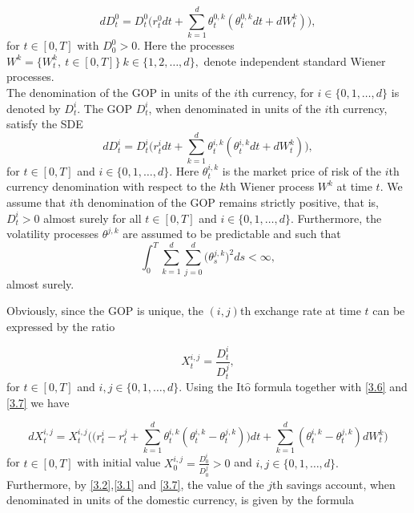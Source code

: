 \documentclass[a4 paper, 12pt]{report}
\theoremstyle{plain}
\begin{document}
\begin{equation}\label{3.5}
dD_t^0 = D_t^0\bigg(r_t^0dt+\sum_{k = 1}^d\theta_t^{0,k}(\theta_t^{0,k}dt+dW_t^k)\bigg),
\end{equation}
for $t \in [0, T]$ with $D_0^0>0$. Here the processes $W^k = \{ W^k_t,~t\in[0,T]\}~k\in \{1,2,\ldots,d\},$ denote independent standard Wiener processes.\\
The denomination of the GOP in units of the $i$th currency, for $i \in \{0, 1,\ldots, d\}$ %
 is denoted by $D_t^i$. The GOP $D_t^i$, when denominated in units of the $i$th
currency, satisfy the SDE
\begin{equation}\label{3.6}
dD_t^i = D_t^i\bigg(r_t^idt+\sum_{k = 1}^d\theta_t^{i,k}(\theta_t^{i,k}dt+dW_t^k)\bigg),
\end{equation}
for $t\in [0,T]$ and $i\in\{0,1,\ldots,d\}$. Here $\theta_t^{i,k}$ is the market price of risk of the $i$th currency denomination with respect to the $k$th Wiener process $W^k$ at time $t$. We assume that $i$th denomination of the GOP remains strictly positive, that is, $D_t^i>0$ almost surely for all $t\in[0,T]$ and $i\in\{0,1,\ldots,d\}$. Furthermore, the volatility processes $\theta^{j,k}$ are assumed to be predictable and such that
$$
\int_0^T\sum_{k = 1}^d\sum_{j = 0}^d\bigg(\theta_s^{j,k}\bigg)^2ds<\infty,
$$
almost surely.\\
\par Obviously, since the GOP is unique, the $(i,j)$th exchange rate at time $t$ can be expressed by the ratio

\begin{equation}\label{3.7}
X_{t}^{i,j} = \frac{D_t^i}{D_t^j},
\end{equation}
for $t\in[0,T]$ and $i,j\in\{0,1,\ldots,d\}$. Using the It$\hat{\mbox{o}}$ formula together with \eqref{3.6} and \eqref{3.7} we have %

\begin{equation}\label{3.8}
dX_t^{i,j} = X_t^{i,j}\bigg(\bigg(r_t^i-r_t^j+\sum_{k = 1}^d\theta_t^{i,k}(\theta_t^{i,k}-\theta_t^{j,k})\bigg)dt+\sum_{k = 1}^d(\theta_t^{i,k} - \theta_t^{j,k})dW_t^k\bigg)
\end{equation}
for $t\in [0,T]$ with initial value $X_0^{i,j} = \frac{D_0^i}{D_0^j}>0$ and $i,j\in\{0,1,\ldots,d\}.$\\

Furthermore, by \eqref{3.2},\eqref{3.1} and \eqref{3.7}, the value of the $j$th savings account, when
denominated in units of the domestic currency, is given by the formula
\end{document}
